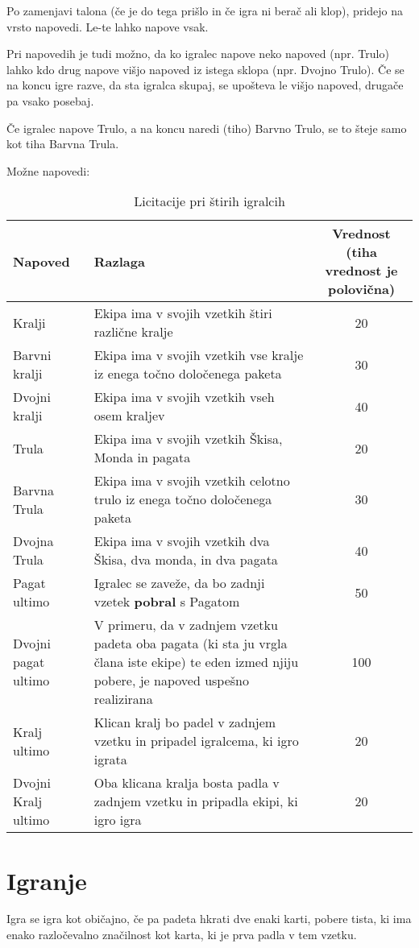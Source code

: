\documentclass[a4paper, ]{report}
\begin{document}
Po zamenjavi talona (če je do tega prišlo in če igra ni berač ali klop), pridejo na vrsto napovedi. Le-te lahko napove vsak.

Pri napovedih je tudi možno, da ko igralec napove neko napoved (npr. Trulo) lahko kdo drug napove višjo napoved iz istega sklopa (npr. Dvojno Trulo). Če se na koncu igre razve, da sta igralca skupaj, se upošteva le višjo napoved, drugače pa vsako posebaj.

Če igralec napove Trulo, a na koncu naredi (tiho) Barvno Trulo, se to šteje samo kot tiha Barvna Trula.

Možne napovedi:
\begin{table}
  \caption{Licitacije pri štirih igralcih}
  \begin{tabularx}{\textwidth}{lXc}
    \toprule
    \textbf{Napoved} & \textbf{Razlaga} & \parbox{25mm}{\textbf{Vrednost} \\ (tiha vrednost je polovična)} \\ \toprule
    Kralji & Ekipa ima v svojih vzetkih štiri različne kralje & 20 \\ \hline
    Barvni kralji & Ekipa ima v svojih vzetkih vse kralje iz enega točno določenega paketa & 30 \\ \hline 
    Dvojni kralji & Ekipa ima v svojih vzetkih vseh osem kraljev & 40 \\ \midrule
    Trula & Ekipa ima v svojih vzetkih Škisa, Monda in pagata & 20 \\ \hline
    Barvna Trula & Ekipa ima v svojih vzetkih celotno trulo iz enega točno določenega paketa & 30 \\ \hline
    Dvojna Trula & Ekipa ima v svojih vzetkih dva Škisa, dva monda, in dva pagata & 40 \\ \midrule
    Pagat ultimo & Igralec se zaveže, da bo zadnji vzetek \textbf{pobral} s Pagatom & 50 \\ \hline
    Dvojni pagat ultimo & V primeru, da v zadnjem vzetku padeta oba pagata (ki sta ju vrgla člana iste ekipe) te eden izmed njiju pobere, je napoved uspešno realizirana & 100 \\ \midrule
    Kralj ultimo & Klican kralj bo padel v zadnjem vzetku in pripadel igralcema, ki igro igrata & 20 \\ \hline
    Dvojni Kralj ultimo & Oba klicana kralja bosta padla v zadnjem vzetku in pripadla ekipi, ki igro igra & 20 \\ \bottomrule
  \end{tabularx}
\end{table}

\chapter{Igranje}

Igra se igra kot običajno, če pa padeta hkrati dve enaki karti, pobere tista, ki ima enako razločevalno značilnost kot karta, ki je prva padla v tem vzetku.
\end{document}
